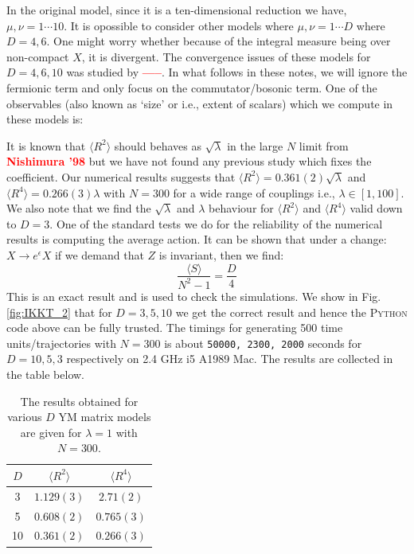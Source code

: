 \documentclass[11pt]{article}
\newcommand{\TODO}[1]{\textcolor{red}{{\bf #1}}}
\newcommand{\PY}{\textsc{Python }}
\begin{document}
In the original model, since it is a ten-dimensional reduction we have, $\mu, \nu = 1 \cdots 10$. It is opossible to consider other models where $\mu, \nu = 1 \cdots D$ where $D=4,6$. One might worry whether because of the integral measure being over non-compact $X$, it is divergent. The convergence issues of these models for $D=4,6,10$ was studied by \TODO{-----}. In what follows in these notes, we will ignore the fermionic term and only focus on the commutator/bosonic term. One of the observables (also known as `size' or i.e., extent of scalars) which we compute in these models is:

It is known that $\langle R^2 \rangle$ should behaves as $\sqrt{\lambda}$ in the large $N$ limit 
from \TODO{Nishimura '98} but we have not found any previous study which fixes the coefficient. 
Our numerical results suggests 
that $ \langle R^2 \rangle = 0.361(2) \sqrt{\lambda}$ 
and $ \langle R^4 \rangle = 0.266(3) \lambda$ with $N = 300$ for a wide range of couplings i.e., 
$\lambda \in [1,100]$. We also note that we find the $\sqrt{\lambda}$ and $\lambda$ behaviour for 
$\langle R^2 \rangle$ and $\langle R^4 \rangle$ valid down to $D=3$. 
One of the standard tests we do for the reliability of the numerical results is 
computing the average action. It can be shown that under a 
change: $X \to e^{\epsilon} X$ if we demand that $Z$ is invariant, 
then we find:
\begin{equation}
\label{eq:SD_IKKT1} 
	\frac{\langle S \rangle}{N^2 - 1} = \frac{D}{4} 
\end{equation}
This is an exact result and is used to check the simulations. We show in Fig. \ref{fig:IKKT_2} that for $D=3,5,10$ we get the correct result and 
hence the \PY code above can be fully trusted. The timings for generating 500 time units/trajectories 
with $N=300$ is about \texttt{50000, 2300, 2000} seconds for $D = 10, 5, 3$ respectively on 2.4 GHz i5 A1989 Mac. 
The results are collected in the table below. 
\begin{table}[h!]
	\centering
	\begin{tabular}{||c c c||} 
		\hline
		$D$ & $ \langle R^2 \rangle$ & $ \langle R^4 \rangle$ \\ [0.5ex] 
		\hline\hline
		3 & $1.129(3) $ & $2.71(2) $  \\ 
		5 & $0.608(2) $ & $0.765(3) $  \\
		10 & $0.361(2)$ & $0.266(3)$
		 \\ [1ex] 
		\hline 
	\end{tabular}
\caption{The results obtained for various $D$ YM matrix models are given for $\lambda=1$ with $N=300$.}
\label{table:D_IKKT_data}
\end{table}
\end{document}
